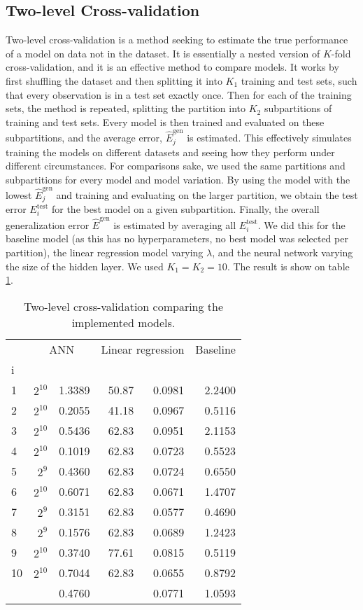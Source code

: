 \subsection{Two-level Cross-validation}
Two-level cross-validation is a method seeking to estimate the true performance of a model on data not in the dataset.
It is essentially a nested version of $ K $-fold cross-validation, and it is an effective method to compare models.
It works by first shuffling the dataset and then splitting it into $ K_1 $ training and test sets, such that every observation is in a test set exactly once.
Then for each of the training sets, the method is repeated, splitting the partition into $ K_2 $ subpartitions of training and test sets.
Every model is then trained and evaluated on these subpartitions, and the average error, $ \hat E_j^{\text{gen}} $ is estimated.
This effectively simulates training the models on different datasets and seeing how they perform under different circumstances.
For comparisons sake, we used the same partitions and subpartitions for every model and model variation.
By using the model with the lowest $ \hat E_j^{\text{gen}} $ and training and evaluating on the larger partition, we obtain the test error $ E_i^{\text{test}} $ for the best model on a given subpartition.
Finally, the overall generalization error $ \hat E^{\text{gen}} $ is estimated by averaging all $ E_i^{\text{test}} $.
We did this for the baseline model (as this has no hyperparameters, no best model was selected per partition), the linear regression model varying $ \lambda $, and the neural network varying the size of the hidden layer.
We used $ K_1=K_2=10 $. The result is show on table \ref{tab:tlcv}.
\begin{table}[H]
	\centering
	\begin{tabular}{l r r r r r}
		\jl{Outer fold}	& \multicolumn{2}{c}{ANN}	& \multicolumn{2}{c}{Linear regression}	& Baseline	\\
		\jl i&\jl{$ h_i^* $}	&\jl{$ E_i^{\text{test}} $}	&\jl{$ \lambda_i^* $}	&\jl{$ E_i^{\text{test}} $}	&\jl{$ E_i^{\text{test}} $}	\\\hline
		1&$ 2^{10} $	&1.3389	&50.87	&0.0981	&2.2400	\\
		2&$ 2^{10} $	&0.2055	&41.18	&0.0967	&0.5116	\\
		3&$ 2^{10} $	&0.5436	&62.83	&0.0951	&2.1153	\\
		4&$ 2^{10} $	&0.1019	&62.83	&0.0723	&0.5523	\\
		5&$ 2^{9} $		&0.4360	&62.83	&0.0724	&0.6550	\\
		6&$ 2^{10} $	&0.6071	&62.83	&0.0671	&1.4707	\\
		7&$ 2^{9} $		&0.3151	&62.83	&0.0577	&0.4690	\\
		8&$ 2^{9} $		&0.1576	&62.83	&0.0689	&1.2423	\\
		9&$ 2^{10} $	&0.3740	&77.61	&0.0815	&0.5119	\\
		10&$ 2^{10} $	&0.7044	&62.83	&0.0655	&0.8792 \\\hline
		\jl{$ \hat E^{\text{gen}} $}	& &0.4760	& &0.0771	& 1.0593
	\end{tabular}
	\caption{Two-level cross-validation comparing the implemented models.}\label{tab:tlcv}
\end{table}\noindent
